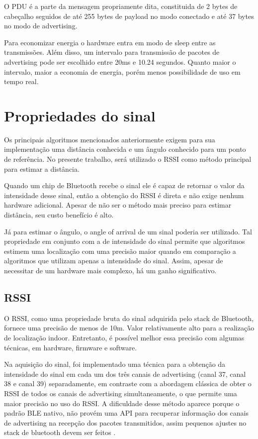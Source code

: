\begin{itemize}
    O PDU é a parte da mensagem propriamente dita, constituida de 2 bytes de cabeçalho seguidos de até 255 bytes de payload no modo conectado e até 37 bytes no modo de advertising. 
    
    Para economizar energia o hardware entra em modo de sleep entre as transmissões. Além disso, um intervalo para transmissão de pacotes de advertising pode ser escolhido entre 20ms e 10.24 segundos. Quanto maior o intervalo, maior a economia de energia, porém menos possibilidade de uso em tempo real.  

\end{itemize}

\section{Propriedades do sinal}
Os principais algoritmos mencionados anteriormente exigem para sua implementação uma distância conhecida e um ângulo conhecido para um ponto de referência. No presente trabalho, será utilizado o RSSI como método principal para estimar a distância. %

Quando um chip de Bluetooth recebe o sinal ele é capaz de retornar o valor da intensidade desse sinal, então a obtenção do RSSI é direta e não exige nenhum hardware adicional. Apesar de não ser o método mais preciso para estimar distância, seu custo benefício é alto.

Já para estimar o ângulo, o angle of arrival de um sinal poderia ser utilizado. Tal propriedade em conjunto com a de intensidade do sinal permite que algoritmos estimem uma localização com uma precisão maior quando em comparação a algoritmos que utilizam apenas a intensidade do sinal. Assim, apesar de necessitar de um hardware mais complexo, há um ganho significativo.

\subsection{RSSI}
O RSSI, como uma propriedade bruta do sinal adquirida pelo stack de Bluetooth, fornece uma precisão de menos de 10m. Valor relativamente alto para a realização de localização indoor. Entretanto, é possível melhor essa precisão com algumas técnicas, em hardware, firmware e software.

Na aquisição do sinal, foi implementado uma técnica para a obtenção da intensidade do sinal em cada um dos três canais de advertising (canal 37, canal 38 e canal 39) separadamente, em contraste com a abordagem clássica de obter o RSSI de todos os canais de advertising simultaneamente, o que permite uma maior precisão no uso do RSSI. A dificuldade desse método aparece porque o padrão BLE nativo, não provém uma API para recuperar informação dos canais de advertising na recepção dos pacotes transmitidos, assim pequenos ajustes no stack de bluetooth devem ser feitos \cite{art16}.

